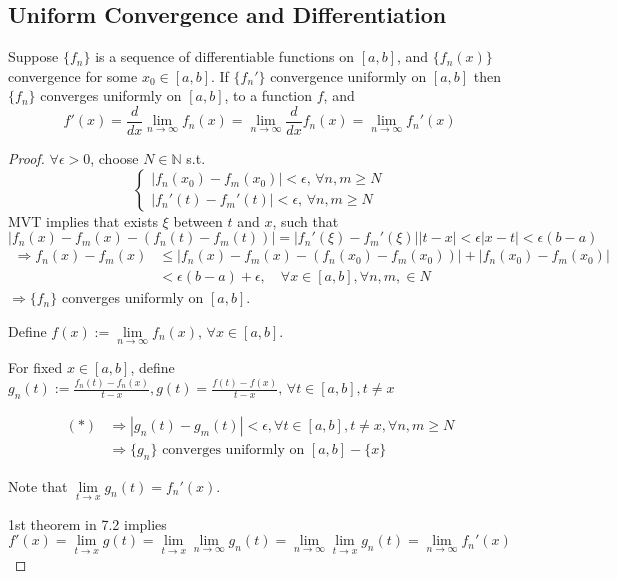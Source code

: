 \subsection{Uniform Convergence and Differentiation}
\begin{theorem}
    Suppose $ \{f_n\}  $ is a sequence of differentiable functions on $ [a,b]  $, and  $ \{f_n(x)\} $ convergence for some  $ x_0\in[a,b] $.
    If  $ \{f_n' \} $ convergence uniformly on  $ [a,b]  $ then  $ \{f_n \} $ converges uniformly on $ [a,b ] $, to a function $ f $,
    and 
    \begin{equation*}
        f'(x)=\frac{d}{dx}\lim\limits_{n\to\infty } f_n(x)=\lim\limits_{n\to\infty } \frac{d }{dx }f_n(x)=\lim\limits_{n\to\infty } f_n'(x )
    \end{equation*}  
\end{theorem}
\begin{proof}
     $ \forall \epsilon>0  $, choose  $ N\in\mathbb{N } $ s.t. 
     \[
     \begin{cases}
        |f_n(x_0)-f_m(x_0)|<\epsilon, \, \forall n,m\geqslant N \\
        |f_n'(t)-f_m'(t)|<\epsilon,\, \forall n,m\geqslant N
     \end{cases} 
     \]
     MVT implies that  exists $ \xi $ between  $ t  $ and  $ x  $, such that \[ |f_n(x)-f_m(x)-(f_n(t)-f_m(t))|=|f_n'(\xi )-f_m'(\xi )||t-x|<\epsilon|x-t|<\epsilon(b-a) \tag{ $ \ast $ }\]
     \begin{align*}
        \Rightarrow f_n(x)-f_m(x)& \leqslant |f_n(x)-f_m(x)-(f_n(x_0)-f_m(x_0 ))|+|f_n(x_0)-f_m(x_0 )|\\
        &<\epsilon(b-a)+\epsilon,\quad \forall x\in[a,b],\forall n,m,\in N
     \end{align*} 
       $ \Rightarrow\{f_n\} $ converges uniformly on  $ [a,b] $.
       
       Define  $ f(x):=\lim\limits_{n\to\infty }f_n(x),\,\forall x\in [a,b]  $.
       
       For fixed  $ x\in[a,b]  $, define  $ g_n(t):=\frac{f_n(t)-f_n(x)}{t-x},g(t)=\frac{f(t)-f(x) }{t-x },\,\forall t\in[a,b],t\neq x  $ 
      
        \begin{align}
        ( * )&\Rightarrow |g_n(t)-g_m(t)|<\epsilon, \forall t\in [a,b],t\neq x,\forall n,m\geqslant N \\
        &\Rightarrow\{g_n \} \text{ converges uniformly on }[a,b]- \{x\}
       \end{align}
       
       Note that  $ \lim\limits_{t\to x } g_n(t)=f_n'(x)  $.

       1st theorem in 7.2 implies  \[ f'(x)=\lim\limits_{t\to x}g(t)=\lim\limits_{t\to x}\lim\limits_{n\to\infty }g_n(t)=\lim\limits_{n\to \infty}\lim\limits_{t\to x } g_n(t)=\lim\limits_{n\to\infty } f_n'(x) \]  
\end{proof}
